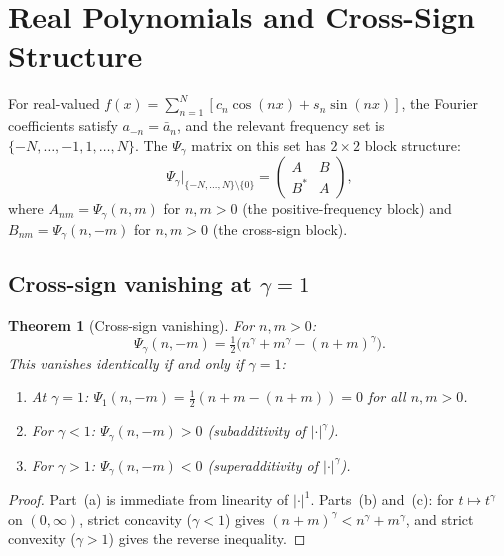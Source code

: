 \documentclass[11pt,a4paper]{article}
\theoremstyle{plain}
\newtheorem{theorem}{Theorem}[section]
\theoremstyle{definition}
\theoremstyle{remark}
\begin{document}
\section{Real Polynomials and Cross-Sign Structure}\label{sec:real}

For real-valued $f(x) = \sum_{n=1}^N [c_n\cos(nx) + s_n\sin(nx)]$,
the Fourier coefficients satisfy $a_{-n} = \bar{a}_n$, and the relevant
frequency set is $\{-N,\ldots,-1,1,\ldots,N\}$. The $\Psi_\gamma$ matrix
on this set has $2 \times 2$ block structure:
\begin{equation}\label{eq:block}
  \Psi_\gamma\Big|_{\{-N,\ldots,N\} \setminus \{0\}}
  = \begin{pmatrix} A & B \\ B^* & A \end{pmatrix},
\end{equation}
where $A_{nm} = \Psi_\gamma(n,m)$ for $n,m > 0$ (the positive-frequency
block) and $B_{nm} = \Psi_\gamma(n,-m)$ for $n,m > 0$ (the cross-sign
block).


\subsection{Cross-sign vanishing at $\gamma = 1$}\label{sec:cross-sign}

\begin{theorem}[Cross-sign vanishing]\label{thm:cross-sign}
For $n,m > 0$:
\begin{equation}\label{eq:cross-sign}
  \Psi_\gamma(n,-m) = \tfrac{1}{2}\bigl(n^\gamma + m^\gamma
  - (n+m)^\gamma\bigr).
\end{equation}
This vanishes identically if and only if $\gamma = 1$:
\begin{enumerate}[label=(\alph*)]
\item At $\gamma = 1$: $\Psi_1(n,-m)
  = \tfrac{1}{2}(n + m - (n+m)) = 0$ for all $n,m > 0$.
\item For $\gamma < 1$: $\Psi_\gamma(n,-m) > 0$
  (subadditivity of $|\cdot|^\gamma$).
\item For $\gamma > 1$: $\Psi_\gamma(n,-m) < 0$
  (superadditivity of $|\cdot|^\gamma$).
\end{enumerate}
\end{theorem}

\begin{proof}
Part~(a) is immediate from linearity of $|\cdot|^1$.
Parts~(b) and~(c): for $t \mapsto t^\gamma$ on $(0,\infty)$,
strict concavity ($\gamma < 1$) gives
$(n+m)^\gamma < n^\gamma + m^\gamma$, and strict convexity
($\gamma > 1$) gives the reverse inequality.
\end{proof}
\end{document}
